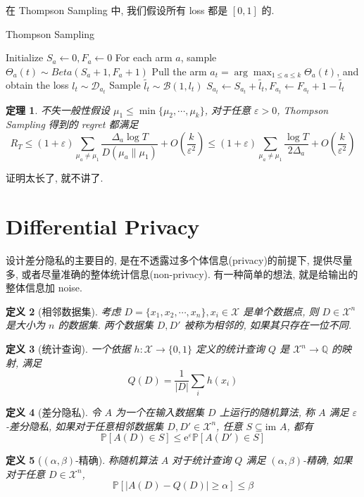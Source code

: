 \documentclass[8pt]{article}
\theoremstyle{compact}
\newtheorem{theorem}{定理}[section]
\newtheorem{definition}[theorem]{定义}
\def\le{\leqslant}
\def\ge{\geqslant}
\def\im{\text{im }}
\def\P#1{\mathbb{P}\left[{#1}\right]}
\def\e{\mathrm{e}}
\begin{document}
在 Thompson Sampling 中, 我们假设所有 loss 都是 $[0, 1]$ 的.

\begin{algorithm}
	\caption{Thompson Sampling}
	\begin{algorithmic}[1]
		\State Initialize $S_a \gets 0, F_a \gets 0$
			\State For each arm $a$, sample $\Theta_a(t) \sim Beta(S_a + 1, F_a + 1)$
			\State Pull the arm $a_t = \arg \max_{1 \le a \le k}\Theta_a(t)$, and obtain the loss $l_t \sim \mathcal D_{a_t}$ 
			\State Sample $\tilde{l_t} \sim \mathcal B(1, l_t)$ 
			\State $S_{a_t} \gets S_{a_t} + \tilde{l_t}, F_{a_t} \gets F_{a_t} + 1 - \tilde{l_t}$
		\EndFor
	\end{algorithmic}
\end{algorithm}
\begin{theorem}
	不失一般性假设 $\mu_1 \le \min\{\mu_2, \cdots, \mu_k\}$, 对于任意 $\varepsilon > 0$, Thompson Sampling 得到的 regret 都满足 $$R_T \le (1 + \varepsilon)\sum_{\mu_a \neq \mu_1}\frac{\Delta_a\log T}{D(\mu_a \| \mu_1)} + O\left(\frac{k}{\varepsilon^2}\right) \le (1 + \varepsilon)\sum_{\mu_a \neq \mu_1}\frac{\log T}{2\Delta_a} + O\left(\frac{k}{\varepsilon^2}\right)$$
\end{theorem}

证明太长了, 就不讲了.

\section{Differential Privacy}

设计差分隐私的主要目的, 是在不透露过多个体信息(privacy)的前提下, 提供尽量多, 或者尽量准确的整体统计信息(non-privacy). 有一种简单的想法, 就是给输出的整体信息加 noise.

\begin{definition}[相邻数据集]
	考虑 $D = \{x_1, x_2, \cdots, x_n\}, x_i \in \mathcal X$ 是单个数据点, 则 $D \in \mathcal X^n$ 是大小为 $n$ 的数据集. 两个数据集 $D, D'$ 被称为相邻的, 如果其只存在一位不同.
\end{definition}
\begin{definition}[统计查询]
	一个依据 $h: \mathcal X \to \{0, 1\}$ 定义的统计查询 $Q$ 是 $\mathcal X^n \to \mathbb Q$ 的映射, 满足 $$Q(D) = \frac{1}{|D|} \sum_i h(x_i)$$
\end{definition}
\begin{definition}[差分隐私]
	令 $A$ 为一个在输入数据集 $D$ 上运行的随机算法, 称 $A$ 满足 $\varepsilon$-差分隐私, 如果对于任意相邻数据集 $D, D' \in \mathcal X^n$, 任意 $S \subseteq \im A$, 都有 $$\P{A(D) \in S} \le \e^{\varepsilon}\P{A(D') \in S}$$
\end{definition}
\begin{definition}[$(\alpha, \beta)$-精确]
	称随机算法 $A$ 对于统计查询 $Q$ 满足 $(\alpha, \beta)$-精确, 如果对于任意 $D \in \mathcal X^n$, $$\P{|A(D) - Q(D)| \ge \alpha} \le \beta$$
\end{definition}
\end{document}
